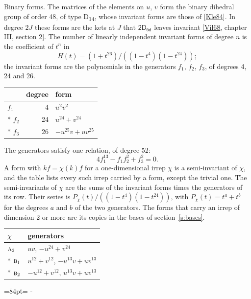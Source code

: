 \documentclass[10pt,a4paper]{article}
\makeatletter
\renewcommand\paragraph{\@startsection{paragraph}{4}{\z@}{1.5ex plus .5ex minus .2ex}{-1em}%
  {\normalfont\small\sffamily\bfseries\color{parttitle}}}
\newcommand{\needspace}[1]{\par\penalty-100\begingroup\dimen0=#1\relax\dimen2=\pagegoal
  \advance\dimen2-\pagetotal\ifdim\dimen0>\dimen2\relax\ifdim\dimen2>0pt\vfil\break\fi\fi
  \endgroup}
\numberwithin{equation}{section}
\newcommand{\grp}[1]{\mathsf{#1}}
\newcommand{\irr}[1]{\text{\normalfont\scshape #1}}
\makeatother
\begin{document}
\paragraph{Binary forms.}
The matrices of the elements on $u$, $v$ form the binary dihedral group of order 48, of type D\textsubscript{14}, whose invariant forms are those of [\href{../../../REFERENCES.pdf\#ref.Kle84}{Kle84}]. In degree $2J$ these forms are the kets at $J$ that $\grp{2D_{6d}}$ leaves invariant [\href{../../../REFERENCES.pdf\#ref.Vil68}{Vil68}, chapter III, section 2]. \label{n:head.degree}\label{n:head.form}The number of linearly independent invariant forms of degree $n$ is the coefficient of $t^n$ in
\begin{equation}\label{e:molien}H(t) = (1 + t^{26})/((1-t^{4})(1-t^{24}));\end{equation}
the invariant forms are the polynomials in the generators $f_1$, $f_2$, $f_3$, of degrees 4, 24 and 26.
{\small\begin{longtable}{@{}lrl@{}}\toprule
& degree & form\\\midrule\endhead
\bottomrule\endfoot\endlastfoot
$f_{1}$ & 4 & $u^{2}v^{2}$\\*
$f_{2}$ & 24 & $u^{24} + v^{24}$\\*
$f_{3}$ & 26 & $-u^{25}v + uv^{25}$\\
\bottomrule\end{longtable}}
The generators satisfy one relation, of degree 52:
\begin{equation}\label{e:relation}4f_{1}^{13} - f_{1}f_{2}^{2} + f_{3}^{2} = 0.\end{equation}
A form with $k f = \chi(k) f$ for a one-dimensional irrep $\chi$ is a semi-invariant of $\chi$, and the table lists every such irrep carried by a form, except the trivial one. \label{n:head.generators}The semi-invariants of $\chi$ are the sums of the invariant forms times the generators of its row. Their series is $P_\chi(t)/((1-t^{4})(1-t^{24}))$, with $P_\chi(t) = t^{a} + t^{b}$ for the degrees $a$ and $b$ of the two generators. The forms that carry an irrep of dimension 2 or more are its copies in the bases of section~\ref{s:bases}.
{\small\begin{longtable}{@{}ll@{}}\toprule
$\chi$ & generators\\\midrule\endhead
\bottomrule\endfoot\endlastfoot
$\irr{a}_{2}$ & $uv$, $-u^{24} + v^{24}$\\*
$\irr{b}_{1}$ & $u^{12} + v^{12}$, $-u^{13}v + uv^{13}$\\*
$\irr{b}_{2}$ & $-u^{12} + v^{12}$, $u^{13}v + uv^{13}$\\
\bottomrule\end{longtable}}
\needspace{84pt}
\end{document}
